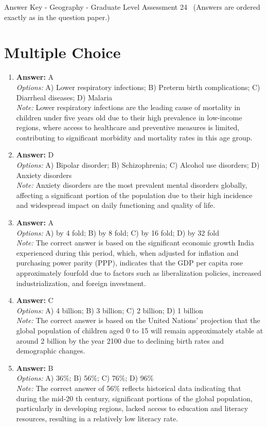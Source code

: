 \documentclass[12pt]{article}
\begin{document}
\begin{center}
Answer Key - Geography - Graduate Level Assessment 24 \
\small (Answers are ordered exactly as in the question paper.)
\end{center}

\section*{Multiple Choice}
\begin{enumerate}[label=\arabic*.]
\item \textbf{Answer:} A
\\ \textit{Options:} A) Lower respiratory infections; B) Preterm birth complications; C) Diarrheal diseases; D) Malaria
\\ \textit{Note:} Lower respiratory infections are the leading cause of mortality in children under five years old due to their high prevalence in low-income regions, where access to healthcare and preventive measures is limited, contributing to significant morbidity and mortality rates in this age group.
\item \textbf{Answer:} D
\\ \textit{Options:} A) Bipolar disorder; B) Schizophrenia; C) Alcohol use disorders; D) Anxiety disorders
\\ \textit{Note:} Anxiety disorders are the most prevalent mental disorders globally, affecting a significant portion of the population due to their high incidence and widespread impact on daily functioning and quality of life.
\item \textbf{Answer:} A
\\ \textit{Options:} A) by 4 fold; B) by 8 fold; C) by 16 fold; D) by 32 fold
\\ \textit{Note:} The correct answer is based on the significant economic growth India experienced during this period, which, when adjusted for inflation and purchasing power parity (PPP), indicates that the GDP per capita rose approximately fourfold due to factors such as liberalization policies, increased industrialization, and foreign investment.
\item \textbf{Answer:} C
\\ \textit{Options:} A) 4 billion; B) 3 billion; C) 2 billion; D) 1 billion
\\ \textit{Note:} The correct answer is based on the United Nations' projection that the global population of children aged 0 to 15 will remain approximately stable at around 2 billion by the year 2100 due to declining birth rates and demographic changes.
\item \textbf{Answer:} B
\\ \textit{Options:} A) 36\%; B) 56\%; C) 76\%; D) 96\%
\\ \textit{Note:} The correct answer of 56\% reflects historical data indicating that during the mid-20 th century, significant portions of the global population, particularly in developing regions, lacked access to education and literacy resources, resulting in a relatively low literacy rate.
\end{enumerate}
\end{document}
